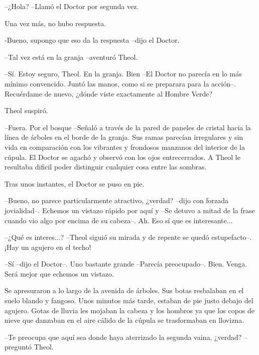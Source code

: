 --¿Hola? --Llamó el Doctor por segunda vez.



Una vez más, no hubo respuesta.



-Bueno, supongo que eso da la respuesta --dijo el Doctor.



--Tal vez está en la granja --aventuró Theol.



--Sí. Estoy seguro, Theol. En la granja. Bien --El Doctor no parecía en lo más mínimo convencido. Juntó las manos, como si se preparara para la acción--. Recuérdame de nuevo, ¿dónde viste exactamente al Hombre Verde?



Theol suspiró.

--Fuera. Por el bosque --Señaló a través de la pared de paneles de cristal hacia la línea de árboles en el borde de la granja. Sus ramas parecían irregulares y sin vida en comparación con los vibrantes y frondosos manzanos del interior de la cúpula. El Doctor se agachó y observó con los ojos entrecerrados. A Theol le resultaba dificil poder distinguir cualquier cosa entre las sombras.



Tras unos instantes, el Doctor se puso en pie.

--Bueno, no parece particularmente atractivo, ¿verdad? --dijo con forzada jovialidad--. Echemos un vistazo rápido por aquí y --Se detuvo a mitad de la frase cuando vio algo por encima de su cabeza--. Ah. Eso sí que es interesante...



--¿Qué es interes...? --Theol siguió su mirada y de repente se quedó estupefacto--. ¡Hay un agujero en el techo!



--Sí --dijo el Doctor--. Uno bastante grande --Parecía preocupado--. Bien. Venga. Será mejor que echemos un vistazo.



Se apresuraron a lo largo de la avenida de árboles. Sus botas resbalaban en el suelo blando y fangoso. Unos minutos más tarde, estaban de pie justo debajo del agujero. Gotas de lluvia les mojaban la cabeza y los hombros ya que los copos de nieve que danzaban en el aire cálido de la cúpula se trasformaban en llovizna.



--Te preocupa que aquí sea donde haya aterrizado la segunda vaina, ¿verdad? --preguntó Theol.



